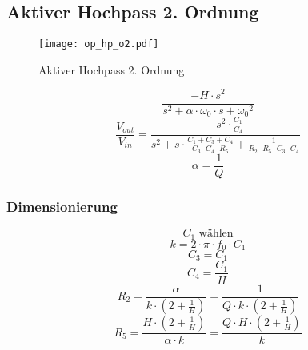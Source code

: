 



\subsection{Aktiver Hochpass 2. Ordnung}
\label{filt:o2-hp}
\begin{figure}[h!]
	\centering
	\texttt{[image: op\_hp\_o2.pdf]}
	\caption{Aktiver Hochpass 2. Ordnung}
	\label{sch:op-hp-o2}
\end{figure}
\[ \frac{-H \cdot s^2}{s^2 + \alpha \cdot \omega_0 \cdot s + {\omega_0}^2} \]
\[ \frac{V_{out}}{V_{in}} = \frac{- s^2 \cdot \frac{C_1}{C_4}}
{s^2 + s \cdot \frac{C_1 + C_3 + C_4}{C_3 \cdot C_4 \cdot R_5} 
+ \frac{1}{R_2 \cdot R_5 \cdot C_3 \cdot C_4}} \]
\[ \alpha = \frac{1}{Q} \]
\subsubsection{Dimensionierung}
\[ C_1 \text{ wählen} \]
\[ k = 2 \cdot \pi \cdot f_0 \cdot C_1 \]
\[ C_3 = C_1 \]
\[ C_4 = \frac{C_1}{H} \]
\[ R_2 = \frac{\alpha}{k \cdot \left(2 + \frac{1}{H}\right)} 
= \frac{1}{Q \cdot k \cdot \left(2 + \frac{1}{H}\right)} \]
\[ R_5 = \frac{H \cdot \left(2 + \frac{1}{H}\right)}{\alpha \cdot k} 
= \frac{Q \cdot H \cdot \left(2 + \frac{1}{H}\right)}{k} \]
